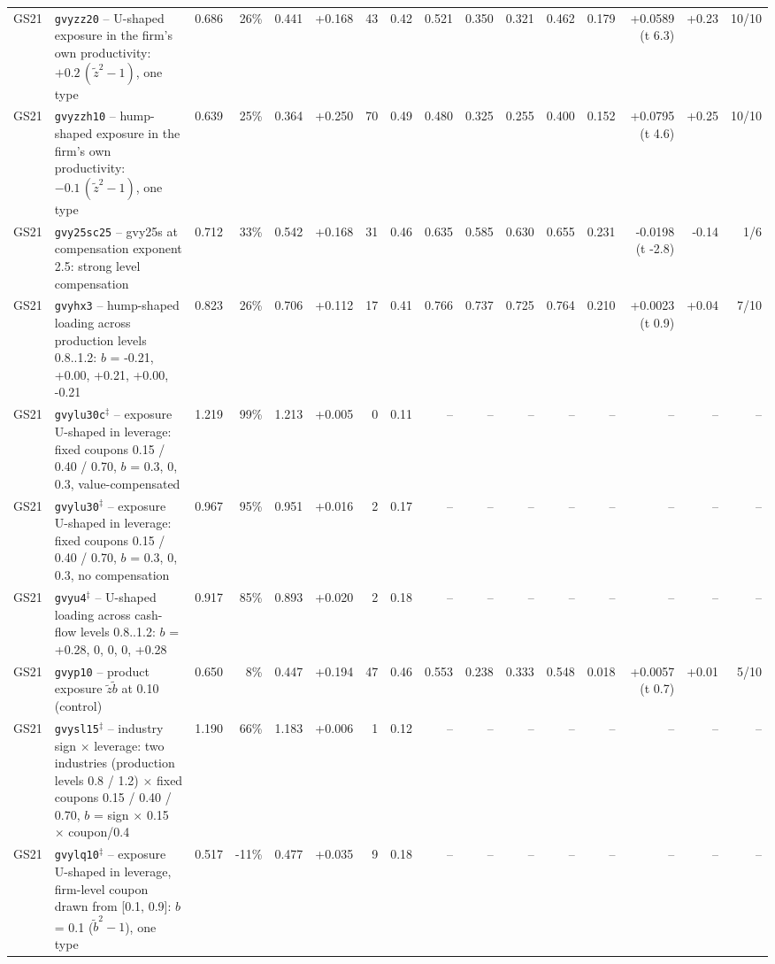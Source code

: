 \begin{landscape}
\begin{longtable}{lp{4.6cm}rrrrrrrrrrrrrr}
GS21 & \texttt{gvyzz20} -- U-shaped exposure in the firm's own productivity: $+0.2\,(\tilde z^2 - 1)$, one type & 0.686 & 26\% & 0.441 & +0.168 & 43 & 0.42 & 0.521 & 0.350 & 0.321 & 0.462 & 0.179 & +0.0589 (t 6.3) & +0.23 & 10/10 \\
GS21 & \texttt{gvyzzh10} -- hump-shaped exposure in the firm's own productivity: $-0.1\,(\tilde z^2 - 1)$, one type & 0.639 & 25\% & 0.364 & +0.250 & 70 & 0.49 & 0.480 & 0.325 & 0.255 & 0.400 & 0.152 & +0.0795 (t 4.6) & +0.25 & 10/10 \\
GS21 & \texttt{gvy25sc25} -- gvy25s at compensation exponent 2.5: strong level compensation & 0.712 & 33\% & 0.542 & +0.168 & 31 & 0.46 & 0.635 & 0.585 & 0.630 & 0.655 & 0.231 & -0.0198 (t -2.8) & -0.14 & 1/6 \\
GS21 & \texttt{gvyhx3} -- hump-shaped loading across production levels 0.8..1.2: $b$ = -0.21, +0.00, +0.21, +0.00, -0.21 & 0.823 & 26\% & 0.706 & +0.112 & 17 & 0.41 & 0.766 & 0.737 & 0.725 & 0.764 & 0.210 & +0.0023 (t 0.9) & +0.04 & 7/10 \\
GS21 & \texttt{gvylu30c}$^\ddagger$ -- exposure U-shaped in leverage: fixed coupons 0.15 / 0.40 / 0.70, $b$ = 0.3, 0, 0.3, value-compensated & 1.219 & 99\% & 1.213 & +0.005 & 0 & 0.11 & -- & -- & -- & -- & -- & -- & -- & -- \\
GS21 & \texttt{gvylu30}$^\ddagger$ -- exposure U-shaped in leverage: fixed coupons 0.15 / 0.40 / 0.70, $b$ = 0.3, 0, 0.3, no compensation & 0.967 & 95\% & 0.951 & +0.016 & 2 & 0.17 & -- & -- & -- & -- & -- & -- & -- & -- \\
GS21 & \texttt{gvyu4}$^\ddagger$ -- U-shaped loading across cash-flow levels 0.8..1.2: $b$ = +0.28, 0, 0, 0, +0.28 & 0.917 & 85\% & 0.893 & +0.020 & 2 & 0.18 & -- & -- & -- & -- & -- & -- & -- & -- \\
GS21 & \texttt{gvyp10} -- product exposure $\tilde z\tilde b$ at 0.10 (control) & 0.650 & 8\% & 0.447 & +0.194 & 47 & 0.46 & 0.553 & 0.238 & 0.333 & 0.548 & 0.018 & +0.0057 (t 0.7) & +0.01 & 5/10 \\
GS21 & \texttt{gvysl15}$^\ddagger$ -- industry sign $\times$ leverage: two industries (production levels 0.8 / 1.2) $\times$ fixed coupons 0.15 / 0.40 / 0.70, $b$ = sign $\times$ 0.15 $\times$ coupon/0.4 & 1.190 & 66\% & 1.183 & +0.006 & 1 & 0.12 & -- & -- & -- & -- & -- & -- & -- & -- \\
GS21 & \texttt{gvylq10}$^\ddagger$ -- exposure U-shaped in leverage, firm-level coupon drawn from [0.1, 0.9]: $b$ = 0.1 ($\tilde b^2 - 1$), one type & 0.517 & -11\% & 0.477 & +0.035 & 9 & 0.18 & -- & -- & -- & -- & -- & -- & -- & -- \\

\end{longtable}
\end{landscape}
